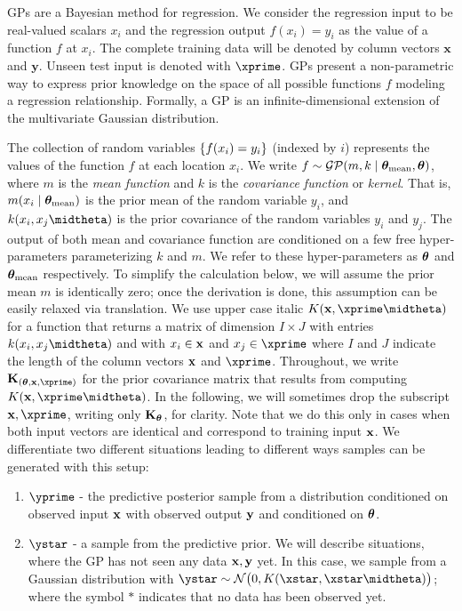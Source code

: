 \ac{GP}s are a Bayesian method for regression. We consider the regression input
to be real-valued scalars $x_i$ and the regression output $f(x_i)=y_i$ as the value of a
function $f$ at $x_i$. The complete training data will be denoted by column
vectors $\mathbf{x}$ and $\mathbf{y}$. Unseen test input is denoted with
$\xprime$.
\ac{GP}s present a non-parametric way to express prior knowledge on the space of all possible functions $f$ modeling
a regression relationship.
Formally, a GP is an infinite-dimensional extension of the multivariate Gaussian distribution.

The collection of random variables $\left\{ f(x_i)=y_i \right\}$ (indexed by $i$) represents the
values of the function $f$ at each location $x_i$.
We write $f \sim \mathcal{GP}(m,k \mid \bm{\theta}_\text{mean},\bm{\theta})$, where $m$ is the {\em mean function} and $k$ is the {\em covariance function} or {\em kernel}.
That is, $m(x_i \mid \bm{\theta}_\text{mean})$ is the prior mean of the random variable $y_i$, and
$k(x_i,x_j \midtheta)$ is the prior covariance of the random variables $y_i$
and $y_j$. The output of both mean and covariance function are conditioned on a
few free hyper-parameters parameterizing $k$ and $m$. We refer to these
hyper-parameters as $\bm{\theta}$ and
$\bm{\theta}_\text{mean}$
respectively.
To simplify the calculation below, we will assume the prior mean $m$ is identically zero; once the derivation is done, this assumption can be easily relaxed via translation.
We use upper case
italic $K(\xbf,\xprime \midtheta )$ for a function that returns a matrix of dimension $I \times J$
with entries $k(x_i,x_j \midtheta )$ and with $x_i \in \mathbf{x}$ and $x_j \in
\xprime$ where $I$ and $J$ indicate the length of the column vectors $\mathbf{x}$ and
$\xprime$.
Throughout, we write $\Kbf_{(\thetabf,\xbf,\xprime)}$ for the prior covariance
matrix that results from computing  $K(\xbf,\xprime \midtheta )$. In the
following, we will sometimes drop the subscript $\xbf,\xprime$, writing
only $\mathbf{K}_{\bm{\theta}}$, for clarity. Note that we do this only in cases when both
input vectors are identical and correspond to training input $\mathbf{x}$.
We differentiate two different situations leading to different ways samples can be generated with
this setup:
\begin{enumerate}
\item ${\yprime}$ - the predictive posterior sample from a distribution
conditioned on observed input $\mathbf{x}$ with observed output $\mathbf{y}$ and conditioned on
$\bm{\theta}$.
\item $\ystar$ - a sample from the predictive prior. We will describe
situations, where the \ac{GP} has not seen any data $\mathbf{x},\mathbf{y}$ yet. In this
case, we sample from a Gaussian distribution with 
     $\ystar \sim \mathcal{N}\big(0,K(\xstar, \xstar \midtheta
)\big)$; where the symbol $*$ indicates that no data has been observed yet. 
\end{enumerate}

